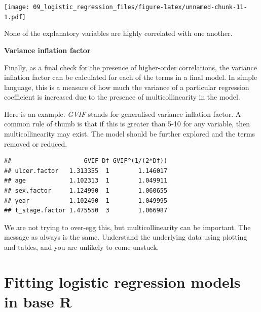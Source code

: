 \documentclass[
  12pt,
  krantz2]{krantz}
\makeatletter
\newenvironment{Shaded}{\begin{snugshade}}{\end{snugshade}}
\newcommand{\KeywordTok}[1]{\textcolor[rgb]{0.13,0.29,0.53}{\textbf{#1}}}
\newcommand{\NormalTok}[1]{#1}
\newcommand{\OperatorTok}[1]{\textcolor[rgb]{0.81,0.36,0.00}{\textbf{#1}}}
\newcommand{\StringTok}[1]{\textcolor[rgb]{0.31,0.60,0.02}{#1}}
\newenvironment{kframe}{%
\medskip{}
\setlength{\fboxsep}{.8em}
 \def\at@end@of@kframe{}%
 \ifinner\ifhmode%
  \def\at@end@of@kframe{\end{minipage}}%
  \begin{minipage}{\columnwidth}%
 \fi\fi%
 \def\FrameCommand##1{\hskip\@totalleftmargin \hskip-\fboxsep
 \colorbox{shadecolor}{##1}\hskip-\fboxsep
     \hskip-\linewidth \hskip-\@totalleftmargin \hskip\columnwidth}%
 \MakeFramed {\advance\hsize-\width
   \@totalleftmargin\z@ \linewidth\hsize
   \@setminipage}}%
 {\par\unskip\endMakeFramed%
 \at@end@of@kframe}
\renewenvironment{Shaded}{\begin{kframe}}{\end{kframe}}
\makeatother
\begin{document}
\texttt{[image: 09\_logistic\_regression\_files/figure-latex/unnamed-chunk-11-1.pdf]}

None of the explanatory variables are highly correlated with one another.

\textbf{Variance inflation factor}

Finally, as a final check for the presence of higher-order correlations, the variance inflation factor can be calculated for each of the terms in a final model.
In simple language, this is a measure of how much the variance of a particular regression coefficient is increased due to the presence of multicollinearity in the model.

Here is an example.
\emph{GVIF} stands for generalised variance inflation factor.
A common rule of thumb is that if this is greater than 5-10 for any variable, then multicollinearity may exist.
The model should be further explored and the terms removed or reduced.

\begin{Shaded}
\end{Shaded}

\begin{verbatim}
##                    GVIF Df GVIF^(1/(2*Df))
## ulcer.factor   1.313355  1        1.146017
## age            1.102313  1        1.049911
## sex.factor     1.124990  1        1.060655
## year           1.102490  1        1.049995
## t_stage.factor 1.475550  3        1.066987
\end{verbatim}

We are not trying to over-egg this, but multicollinearity can be important.
The message as always is the same.
Understand the underlying data using plotting and tables, and you are unlikely to come unstuck.

\hypertarget{fitting-logistic-regression-models-in-base-r}{%
\section{Fitting logistic regression models in base R}\label{fitting-logistic-regression-models-in-base-r}}
\end{document}
